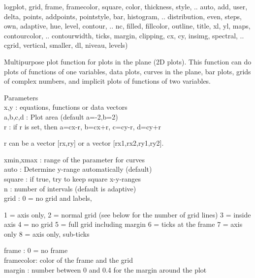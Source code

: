 \documentclass[a4paper,10pt]{article}
\begin{document}
\begin{eulernotebook}
\begin{eulercomment}
\begin{eulercomment}
\begin{eulercomment}
\begin{eulercomment}
\begin{eulerttcomment}
  logplot, grid, frame, framecolor, square, color, thickness, style, ..
  auto, add, user, delta, points, addpoints, pointstyle, bar, histogram,  ..
  distribution, even, steps, own, adaptive, hue, level, contour,  ..
  nc, filled, fillcolor, outline, title, xl, yl, maps, contourcolor, ..
  contourwidth, ticks, margin, clipping, cx, cy, insimg, spectral,  ..
  cgrid, vertical, smaller, dl, niveau, levels)
\end{eulerttcomment}
\begin{eulercomment}
Multipurpose plot function for plots in the plane (2D plots). This function can do
plots of functions of one variables, data plots, curves in the plane, bar plots, grids
of complex numbers, and implicit plots of functions of two variables.

Parameters
\\
x,y       : equations, functions or data vectors\\
a,b,c,d   : Plot area (default a=-2,b=2)\\
r         : if r is set, then a=cx-r, b=cx+r, c=cy-r, d=cy+r\\
\end{eulercomment}
\begin{eulerttcomment}
            r can be a vector [rx,ry] or a vector [rx1,rx2,ry1,ry2].
\end{eulerttcomment}
\begin{eulercomment}
xmin,xmax : range of the parameter for curves\\
auto      : Determine y-range automatically (default)\\
square    : if true, try to keep square x-y-ranges\\
n         : number of intervals (default is adaptive)\\
grid      : 0 = no grid and labels,\\
\end{eulercomment}
\begin{eulerttcomment}
            1 = axis only,
            2 = normal grid (see below for the number of grid lines)
            3 = inside axis
            4 = no grid
            5 = full grid including margin
            6 = ticks at the frame
            7 = axis only
            8 = axis only, sub-ticks
\end{eulerttcomment}
\begin{eulercomment}
frame     : 0 = no frame\\
framecolor: color of the frame and the grid\\
margin    : number between 0 and 0.4 for the margin around the plot\\

\end{eulercomment}
\end{eulercomment}
\end{eulercomment}
\end{eulercomment}
\end{eulercomment}
\end{eulernotebook}
\end{document}
